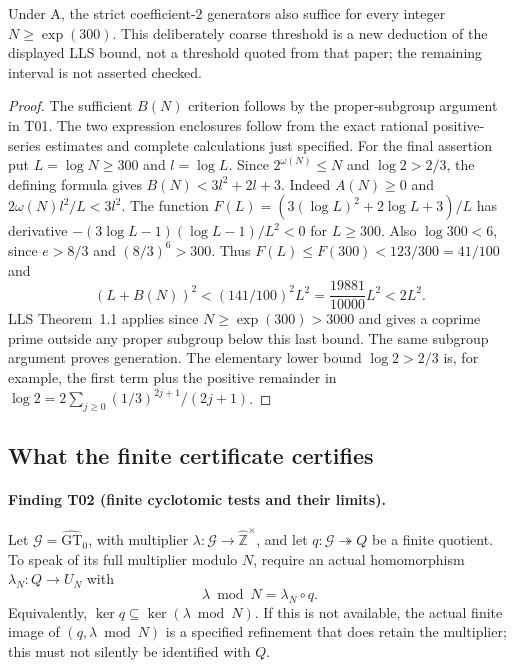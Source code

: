 Under A, the strict coefficient-$2$ generators also suffice for every
integer $N\ge\exp(300)$. This deliberately coarse threshold is a new
deduction of the displayed LLS bound, not a threshold quoted from that
paper; the remaining interval is not asserted checked.

\begin{proof}
The sufficient $B(N)$ criterion follows by the proper-subgroup argument
in T01. The two expression enclosures follow from the exact rational
positive-series estimates and complete calculations just specified.
For the final assertion put $L=\log N\ge300$ and $l=\log L$.
Since $2^{\omega(N)}\le N$ and $\log2>2/3$, the defining formula gives
$B(N)<3l^2+2l+3$. Indeed $A(N)\ge0$ and
$2\omega(N)l^2/L<3l^2$. The function
$F(L)=(3(\log L)^2+2\log L+3)/L$ has derivative
$-(3\log L-1)(\log L-1)/L^2<0$ for $L\ge300$.
Also $\log300<6$, since $e>8/3$ and $(8/3)^6>300$.
Thus $F(L)\le F(300)<123/300=41/100$ and
\[
 (L+B(N))^2<(141/100)^2L^2
             =\frac{19881}{10000}L^2<2L^2.
\]
LLS Theorem~1.1 applies since $N\ge\exp(300)>3000$ and gives a
coprime prime outside any proper subgroup below this last bound.
The same subgroup argument proves generation. The elementary lower
bound $\log2>2/3$ is, for example, the first term plus the positive
remainder in $\log2=2\sum_{j\ge0}(1/3)^{2j+1}/(2j+1)$.
\end{proof}

\subsection{What the finite certificate certifies}

\paragraph{Finding T02 (finite cyclotomic tests and their limits).}
Let $\mathcal G=\widehat{\mathrm{GT}}_0$, with multiplier
$\lambda:\mathcal G\to\widehat{\mathbb Z}^{\times}$, and let
$q:\mathcal G\twoheadrightarrow Q$ be a finite quotient. To speak of
its full multiplier modulo $N$, require an actual homomorphism
$\lambda_N:Q\to U_N$ with
\[
                    \lambda\bmod N=\lambda_N\circ q.
 \tag{T02.1}
\]
Equivalently, $\ker q\subseteq\ker(\lambda\bmod N)$. If this is not
available, the actual finite image of $(q,\lambda\bmod N)$ is a
specified refinement that does retain the multiplier; this must not
silently be identified with $Q$.

